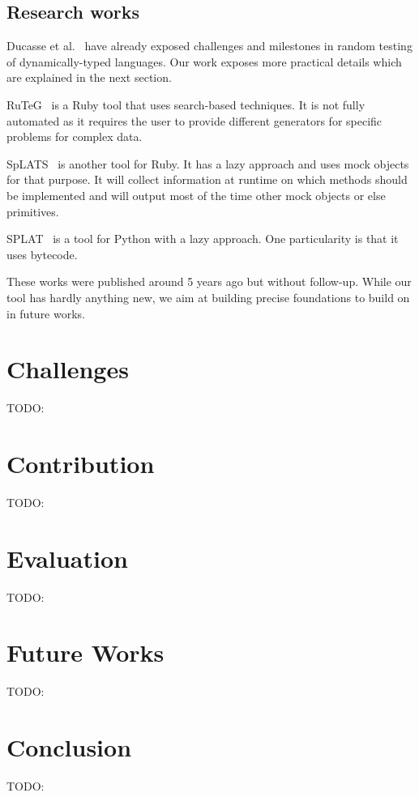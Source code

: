 \documentclass{llncs2e/llncs}
\def\todo#1{{\color{red}TODO:\quad#1}}
\begin{document}
\subsection{Research works}
\label{related_research}

Ducasse et al.~\cite{ducasse2011challenges} have already exposed challenges and
milestones in random testing of dynamically-typed languages. Our work exposes
more practical details which are explained in the next section.

RuTeG~\cite{mairhofer2011search} is a Ruby tool that uses search-based
techniques. It is not fully automated as it requires the user to provide
different generators for specific problems for complex data.

SpLATS~\cite{splats} is another tool for Ruby. It has a lazy approach and uses
mock objects for that purpose. It will collect information at runtime on which
methods should be implemented and will output most of the time other mock
objects or else primitives.

SPLAT~\cite{splat} is a tool for Python with a lazy approach. One particularity
is that it uses bytecode.

These works were published around 5 years ago but without follow-up. While our
tool has hardly anything new, we aim at building precise foundations to build on
in future works.


\section{Challenges}
\label{challenges}
\todo{}


\section{Contribution}
\label{contribution}
\todo{}


\section{Evaluation}
\label{evaluation}
\todo{}


\section{Future Works}
\label{futureworks}
\todo{}


\section{Conclusion}
\label{conclusion}
\todo{}
\end{document}
